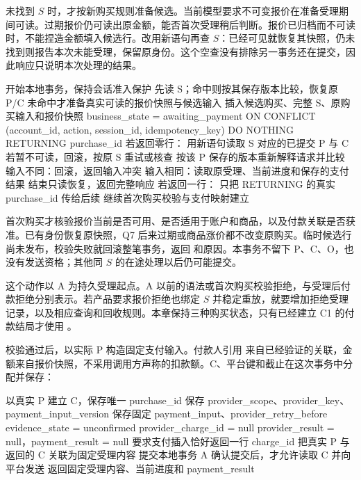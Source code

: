 未找到 \(S\) 时，才按新购买规则准备候选。当前模型要求不可变报价在准备受理期间可读。过期报价仍可读出原金额，能否首次受理稍后判断。报价已归档而不可读时，不能捏造金额填入候选行。改用新语句再查 \(S\)：已经可见就恢复其快照，仍未找到则报告本次未能受理，保留原身份。这个空查没有排除另一事务还在提交，因此响应只说明本次处理的结果。

\begin{BookCode}
开始本地事务，保持会话准入保护
先读 S；命中则按其保存版本比较，恢复原 P/C
未命中才准备真实可读的报价快照与候选输入
插入候选购买、完整 S、原购买输入和报价快照
    business_state = awaiting_payment
    ON CONFLICT (account_id, action, session_id, idempotency_key)
    DO NOTHING RETURNING purchase_id
若返回零行：
    用新语句读取 S 对应的已提交 P 与 C
    若暂不可读，回滚，按原 S 重试或核查
    按该 P 保存的版本重新解释请求并比较
    输入不同：回滚，返回输入冲突
    输入相同：读取原受理、当前进度和保存的支付结果
    结束只读恢复，返回完整响应
若返回一行：
    只把 RETURNING 的真实 purchase_id 传给后续
    继续首次购买校验与支付映射建立
\end{BookCode}

首次购买才核验报价当前是否可用、是否适用于账户和商品，以及付款关联是否获准。已有身份恢复原快照，Q7 后来过期或商品涨价都不改变原购买。临时候选行尚未发布，校验失败就回滚整笔事务，返回  和原因。本事务不留下 P、C、O，也没有发送资格；其他同 \(S\) 的在途处理以后仍可能提交。

这个动作以 A 为持久受理起点。A 以前的语法或首次购买校验拒绝，与受理后付款拒绝分别表示。若产品要求报价拒绝也绑定 \(S\) 并稳定重放，就要增加拒绝受理记录，以及相应查询和回收规则。本章保持三种购买状态，只有已经建立 C1 的付款结局才使用 。


校验通过后，以实际 P 构造固定支付输入。付款人引用  来自已经验证的关联，金额来自报价快照，不采用调用方声称的扣款额。C、平台键和截止在这次事务中分配并保存：

\begin{BookCode}
以真实 P 建立 C，保存唯一 purchase_id
保存 provider_scope、provider_key、payment_input_version
保存固定 payment_input、provider_retry_before
    evidence_state = unconfirmed
    provider_charge_id = null
    provider_result = null，payment_result = null
要求支付插入恰好返回一行 charge_id
把真实 P 与返回的 C 关联为固定受理内容
提交本地事务 A
确认提交后，才允许读取 C 并向平台发送
返回固定受理内容、当前进度和 payment_result
\end{BookCode}

